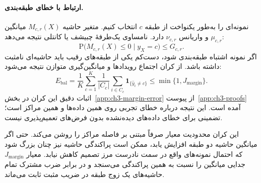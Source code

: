 \paragraph{ارتباط با خطای طبقه‌بندی.}
نمونه‌ای را به‌طور یکنواخت از طبقه $c$ انتخاب کنیم. متغیر حاشیه $M_{c,r}(X)$ میانگین $\mu_{c,r}$ و واریانس $\nu_{c,r}$ دارد. نامساوی یک‌طرفهٔ چبیشف یا کانتلی
\cite{BoucheronLugosiMassart2013} نتیجه می‌دهد:
\begin{equation}\label{cmp:eq:ch3-margin-Cantelli}
\mathrm P\bigl(M_{c,r}(X)\le0\mid y_X=c\bigr)
\le G_{c,r}.
\end{equation}
اگر نمونه اشتباه طبقه‌بندی شود، دست‌کم یکی از طبقه‌های رقیب باید حاشیه‌ای نامثبت داشته باشد. از کران اجتماع رویدادها و میانگین‌گیری متوازن نتیجه می‌شود:
\begin{equation}\label{cmp:eq:ch3-margin-error-bound}
\boxed{
E_{\mathrm{bal}}
=\frac1K\sum_{c=1}^{K}\frac1{|C_c|}
\sum_{i\in C_c}\mathbf1_{\{\widehat y_i\ne c\}}
\le\min\{1,J_{\mathrm{margin}}\}.}
\end{equation}
اثبات دقیق این کران در بخش~\ref{app:ch3-margin-error} از پیوست~\ref{app:ch3-proofs} آمده است. این نتیجه درباره خطای تجربی روی همین داده‌ها و همین مراکز است؛ تضمینی برای خطای داده‌های دیده‌نشده بدون فرض‌های تعمیم‌پذیری نیست.

این کران محدودیت معیار صرفاً مبتنی بر فاصله مراکز را روشن می‌کند. حتی اگر میانگین حاشیه دو طبقه افزایش یابد، ممکن است پراکندگی حاشیه نیز چنان بزرگ شود که احتمال نمونه‌های واقع در سمت نادرست مرز تصمیم کاهش نیابد. معیار $J_{\mathrm{margin}}$ جدایی میانگین را نسبت به همین پراکندگی می‌سنجد و در برابر ضرب مشترک تمام حاشیه‌های یک زوج طبقه در ضریب مثبت ثابت می‌ماند.


